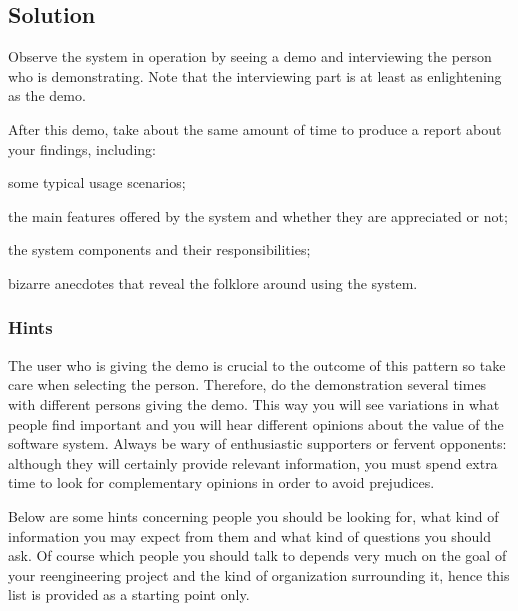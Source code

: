 \documentclass[a4paper,10pt,twoside]{book}
\begin{document}
\subsection*{Solution}

Observe the system in operation by seeing a demo and interviewing the person who is demonstrating. Note that the interviewing part is at least as enlightening as the demo. 

After this demo, take about the same amount of time to produce a report about your findings, including:

\begin{bulletlist}
  \item some typical usage scenarios;

  \item the main features offered by the system and whether they are appreciated or not;

  \item the system components and their responsibilities; 

  \item bizarre anecdotes that reveal the folklore around using the system.
\end{bulletlist}

\subsubsection*{Hints}

The user who is giving the demo is crucial to the outcome of this pattern so take care when selecting the person. Therefore, do the demonstration several times with different persons giving the demo. This way you will see variations in what people find important and you will hear different opinions about the value of the software system. Always be wary of enthusiastic supporters or fervent opponents: although they will certainly provide relevant information, you must spend extra time to look for complementary opinions in order to avoid prejudices. 

Below are some hints concerning people you should be looking for, what kind of information you may expect from them and what kind of questions you should ask. Of course which people you should talk to depends very much on the goal of your reengineering project and the kind of organization surrounding it, hence this list is provided as a starting point only.
\end{document}
